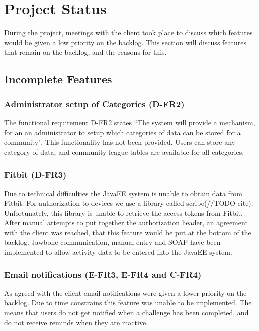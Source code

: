 \chapter{Project Status}

During the project, meetings with the client took place to discuss which features would be given a low priority on the backlog. This section will discuss features that remain on the backlog, and the reasons for this.

\section{Incomplete Features}

\subsection{Administrator setup of Categories (D-FR2)}
The functional requirement D-FR2 states ``The system will provide a mechanism, for an an administrator to setup which categories of data can be stored for a community". This functionality has not been provided. Users can store any category of data, and community league tables are available for all categories.

\subsection{Fitbit (D-FR3)}
Due to technical difficulties the JavaEE system is unable to obtain data from Fitbit. For authorization to devices we use a library called scribe(//TODO cite). Unfortunately, this library is unable to retrieve the access tokens from Fitbit. After manual attempts to put together the authorization header, an agreement with the client was reached, that this feature would be put at the bottom of the backlog. Jawbone communication, manual entry and SOAP have been implemented to allow activity data to be entered into the JavaEE system.

\subsection{Email notifications (E-FR3, E-FR4 and C-FR4)}

As agreed with the client email notifications were given a lower priority on the backlog. Due to time constrains this feature was unable to be implemented. The means that users do not get notified when a challenge has been completed, and do not receive reminds when they are inactive. 

